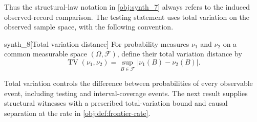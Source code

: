 Thus the structural-law notation in \cref{obj:synth_7} always refers to the induced observed-record comparison. The testing statement uses total variation on the observed sample space, with the following convention.

\begin{definitionv}{synth_8}[Total variation distance]
For probability measures \(\nu_1\) and \(\nu_2\) on a common measurable space \((\Omega,\mathcal F)\), define their total variation distance by
\[
\operatorname{TV}(\nu_1,\nu_2)
=\sup_{B\in\mathcal F}\bigl|\nu_1(B)-\nu_2(B)\bigr|.
\]
\end{definitionv}

Total variation controls the difference between probabilities of every observable event, including testing and interval-coverage events. The next result supplies structural witnesses with a prescribed total-variation bound and causal separation at the rate in \cref{obj:def:frontier-rate}.

